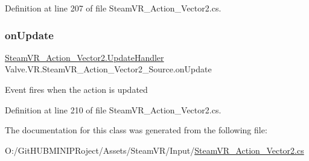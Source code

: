 Definition at line 207 of file Steam\+V\+R\+\_\+\+Action\+\_\+\+Vector2.\+cs.

\mbox{\label{class_valve_1_1_v_r_1_1_steam_v_r___action___vector2___source_acf147220613d53f51ed3184c5a4dceef}} 
\subsubsection{\texorpdfstring{onUpdate}{onUpdate}}
{\footnotesize\ttfamily \mbox{\hyperlink{class_valve_1_1_v_r_1_1_steam_v_r___action___vector2_a3f6872fd8960cbb9f571b0362857d9b5}{Steam\+V\+R\+\_\+\+Action\+\_\+\+Vector2.\+Update\+Handler}} Valve.\+V\+R.\+Steam\+V\+R\+\_\+\+Action\+\_\+\+Vector2\+\_\+\+Source.\+on\+Update}



Event fires when the action is updated 



Definition at line 210 of file Steam\+V\+R\+\_\+\+Action\+\_\+\+Vector2.\+cs.



The documentation for this class was generated from the following file\+:\begin{DoxyCompactItemize}
\item 
O\+:/\+Git\+H\+U\+B\+M\+I\+N\+I\+P\+Roject/\+Assets/\+Steam\+V\+R/\+Input/\mbox{\hyperlink{_steam_v_r___action___vector2_8cs}{Steam\+V\+R\+\_\+\+Action\+\_\+\+Vector2.\+cs}}\end{DoxyCompactItemize}
